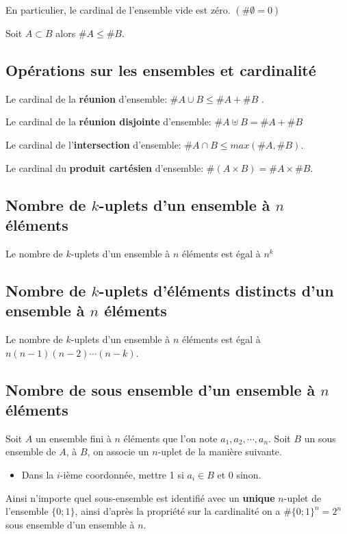 \documentclass[french]{book}
\newcommand{\ie}{\leq}
\begin{document}
\begin{rem}
En particulier, le cardinal de l'ensemble vide est zéro. $(\#\emptyset =0)$
\end{rem}

\begin{prop}
Soit $A\subset B$ alors $\#A \ie \#B$.
\end{prop}

\subsection{Opérations sur les ensembles et cardinalité}
\begin{prop}
Le cardinal de la \textbf{réunion} d'ensemble: $ \# A\cup B \ie \#A +\#B$ .
\par Le cardinal de la \textbf{réunion disjointe} d'ensemble: $ \# A\uplus B = \#A +\#B$
\par Le cardinal de l'\textbf{intersection} d'ensemble: $ \# A\cap B \ie max(\#A,\#B)$.
\par Le cardinal du \textbf{produit cartésien} d'ensemble: $\# (A\times B)= \#A \times \#B$.
\end{prop}

\subsection{Nombre de $k$-uplets d'un ensemble à $n$ éléments}
\begin{prop}
Le nombre  de $k$-uplets d'un ensemble à $n$ éléments est égal à $n^k$ 
\end{prop}

\subsection{Nombre de $k$-uplets d'éléments distincts d'un ensemble à $n$ éléments}
\begin{prop}
Le nombre  de $k$-uplets d'un ensemble à $n$ éléments est égal à $n(n-1)(n-2)\cdots(n-k)$. 
\end{prop}

\subsection{Nombre de sous ensemble d’un ensemble à $n$ éléments}
Soit $A$ un ensemble fini à $n$ éléments que l'on note $a_1,a_2,\cdots,a_n$. Soit $B$ un sous ensemble de $A$, à $B$, on associe un $n$-uplet de la manière suivante.
\begin{itemize}
\item[$\bullet$]Dans la $i$-ième coordonnée, mettre 1 si $a_i \in B$ et 0 sinon.
\end{itemize}
Ainsi n'importe quel sous-ensemble est identifié avec un \textbf{unique} $n$-uplet de l'ensemble $\{0;1\}$, ainsi d'apr\`es la propriété sur la cardinalité on a $\# \{0;1\}^n =2^n$ sous ensemble d'un ensemble à $n$.  
\end{document}
